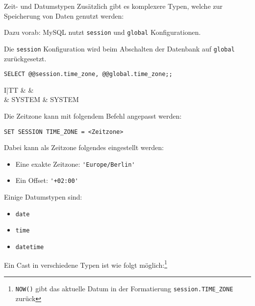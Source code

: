 \begin{sql}{Zeit- und Datumstypen}
    Zusätzlich gibt es komplexere Typen, welche zur Speicherung von Daten genutzt werden:
    
    Dazu vorab:
    MySQL nutzt \texttt{session} und \texttt{global} Konfigurationen.

    Die \texttt{session} Konfiguration wird beim Abschalten der Datenbank auf \texttt{global} zurückgesetzt.

    \begin{lstlisting}[language=mysql]
        SELECT @@session.time_zone, @@global.time_zone;;
    \end{lstlisting}

    \setcounter{rownum}{0}
    \begin{tabular}{I|TT}
        &  &  \\ & SYSTEM & SYSTEM \\
    \end{tabular}

    Die Zeitzone kann mit folgendem Befehl angepasst werden:

    \begin{lstlisting}[language=mysql]
        SET SESSION TIME_ZONE = <Zeitzone>
    \end{lstlisting}

    Dabei kann als Zeitzone folgendes eingestellt werden:

    \begin{itemize}
        \item Eine exakte Zeitzone: \lstinline[language=mysql]{'Europe/Berlin'}
        \item Ein Offset: \lstinline[language=mysql]{'+02:00'}
    \end{itemize}

    Einige Datumstypen sind:

    \begin{itemize}
        \item \texttt{date}
        \item \texttt{time}
        \item \texttt{datetime}
    \end{itemize}

    Ein Cast in verschiedene Typen ist wie folgt möglich:\footnote{\texttt{NOW()} gibt das aktuelle Datum in der Formatierung \texttt{session.TIME\_ZONE} zurück}


\end{sql}
